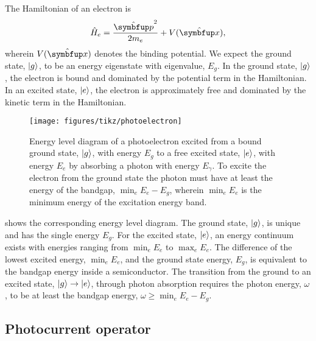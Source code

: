 The Hamiltonian of an electron is
\begin{equation}
	\hat{H}_e
	=
	\frac{\vu{p}^2}{2m_e}
	+
	V(\vu{x})
	,
\end{equation}
wherein $V(\vu{x})$ denotes the binding potential.
We expect the ground state, $\lvert g\rangle$, to be an energy eigenstate with eigenvalue, $E_g$.
In the ground state, $\lvert g\rangle$, the electron is bound and dominated by the potential term in the Hamiltonian.
In an excited state, $\lvert e\rangle$, the electron is approximately free and dominated by the kinetic term in the Hamiltonian.
\begin{figure}[htb]
    \centering
    \texttt{[image: figures/tikz/photoelectron]}
    \caption{Energy level diagram of a photoelectron excited from a bound ground state, $\lvert g\rangle$, with energy $E_g$ to a free excited state, $\lvert e\rangle$, with energy $E_e$ by absorbing a photon with energy $E_\gamma$. To excite the electron from the ground state the photon must have at least the energy of the bandgap, $\min_eE_e-E_g$, wherein $\min_eE_e$ is the minimum energy of the excitation energy band.}\label{fig:photoelectron}
\end{figure}
 shows the corresponding energy level diagram.
The ground state, $\lvert g\rangle$, is unique and has the single energy $E_g$.
For the excited state, $\lvert e\rangle$, an energy continuum exists with energies ranging from $\min_eE_e$ to $\max_eE_e$.
The difference of the lowest excited energy, $\min_eE_e$, and the ground state energy, $E_g$, is equivalent to the bandgap energy inside a semiconductor.
The transition from the ground to an excited state, $\lvert g\rangle\to\lvert e\rangle$, through photon absorption requires the photon energy, $\omega$, to be at least the bandgap energy, $\omega\geq\min_eE_e-E_g$.

\subsection{Photocurrent operator}


